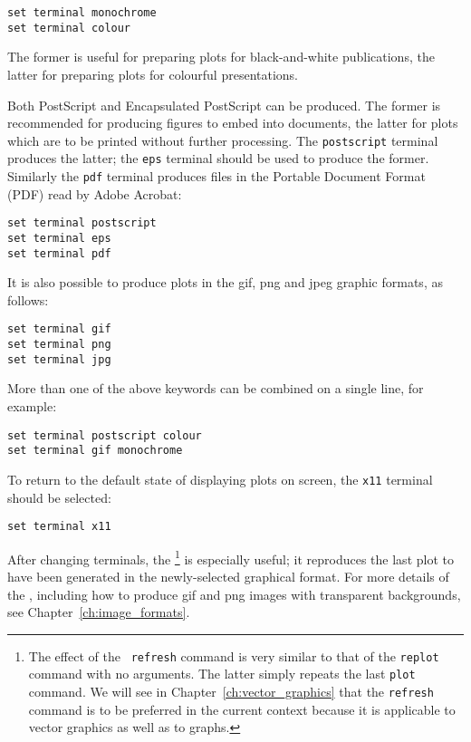 \begin{verbatim}
set terminal monochrome
set terminal colour
\end{verbatim}

\noindent The former is useful for preparing plots for black-and-white
publications, the latter for preparing plots for colourful presentations.

Both PostScript and Encapsulated PostScript can be produced. The former is
recommended for producing figures to embed into documents, the latter for plots
which are to be printed without further processing. The {\tt postscript}
terminal produces the latter; the {\tt eps} terminal should be used to produce
the former.  Similarly the {\tt pdf} terminal produces files in the Portable
Document Format (PDF) read by Adobe Acrobat:

\begin{verbatim}
set terminal postscript
set terminal eps
set terminal pdf
\end{verbatim}

It is also possible to produce plots in the gif, png and jpeg graphic formats,
as follows:

\begin{verbatim}
set terminal gif
set terminal png
set terminal jpg
\end{verbatim}

More than one of the above keywords can be combined on a single line, for
example:

\begin{verbatim}
set terminal postscript colour
set terminal gif monochrome
\end{verbatim}

To return to the default state of displaying plots on screen, the {\tt x11}
terminal should be selected:

\begin{verbatim}
set terminal x11
\end{verbatim}

After changing terminals, the \footnote{The effect of the {\tt
refresh} command is very similar to that of the {\tt replot} command with no
arguments. The latter simply repeats the last {\tt plot} command. We will see
in Chapter~\ref{ch:vector_graphics} that the {\tt refresh} command is to be
preferred in the current context because it is applicable to vector graphics as
well as to graphs.} is especially useful; it reproduces the last plot to have
been generated in the newly-selected graphical format.  For more details of the
, including how to produce gif and png images with
transparent backgrounds, see Chapter~\ref{ch:image_formats}.

